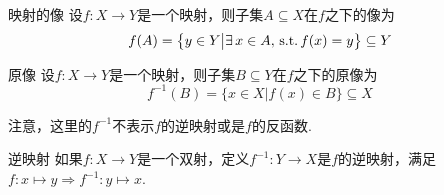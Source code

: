 \begin{definition}{映射的像}
    设$f:X\to Y$是一个映射，则子集$A\subseteq X$在$f$之下的像为
    \[f(A)=\big\{y\in Y\big|\exists\, x\in A,\,\operatorname{\text{s.t.}} f(x)=y \big\}\subseteq Y\]
\end{definition}

\begin{definition}{原像}
    设$f:X\to Y$是一个映射，则子集$B\subseteq Y$在$f$之下的原像为
    \[f^{-1}(B)=\big\{x\in X\big|f(x)\in B \big\}\subseteq X\]
\end{definition}

\begin{note}
    注意，这里的$f^{-1}$不表示$f$的逆映射或是$f$的反函数.
\end{note}

\begin{definition}{逆映射}
    如果$f:X\to Y$是一个双射，定义$f^{-1}:Y\to X$是$f$的逆映射，满足$f:x\mapsto y \Rightarrow f^{-1}:y\mapsto x$.
\end{definition}